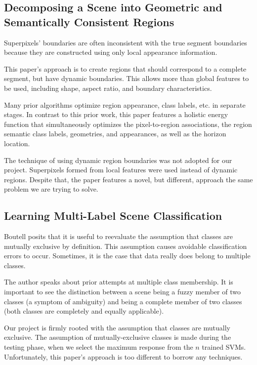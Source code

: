 \documentclass[10pt,twocolumn,letterpaper]{article}
\begin{document}
\subsection{Decomposing a Scene into Geometric and Semantically Consistent Regions \cite{gould}}

Superpixels' boundaries are often inconsistent with the true segment boundaries because they are constructed using only local appearance information.  

This paper's approach is to create regions that should correspond to a complete segment, but have dynamic boundaries. This allows more than global features to be used, including shape, aspect ratio, and boundary characteristics.

Many prior algorithms optimize region appearance, class labels, etc. in separate stages. In contrast to this prior work, this paper features a holistic energy function that simultaneously optimizes the pixel-to-region associations, the region semantic class labels, geometries, and appearances, as well as the horizon location.

The technique of using dynamic region boundaries was not adopted for our project. Superpixels formed from local features were used instead of dynamic regions.  Despite that, the paper features a novel, but different, approach the same problem we are trying to solve.

\subsection{Learning Multi-Label Scene Classification \cite{Boutell20041757}}

Boutell posits that it is useful to reevaluate the assumption that classes are mutually exclusive by definition. This assumption causes avoidable classification errors to occur.  Sometimes, it is the case that data really does belong to multiple classes.

The author speaks about prior attempts at multiple class membership.  It is important to see the distinction between a scene being a fuzzy member of two classes (a symptom of ambiguity) and being a complete member of two classes (both classes are completely and equally applicable).

Our project is firmly rooted with the assumption that classes are mutually exclusive.  
The assumption of mutually-exclusive classes is made during the testing phase, when we select the maximum response from the $n$ trained SVMs. Unfortunately, this paper's approach is too different to borrow any techniques.  
\end{document}
